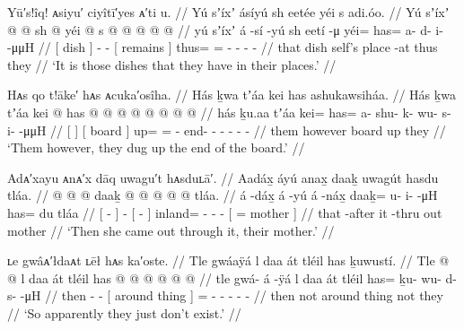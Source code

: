 \ex\label{ex:92-42-have-dishes-in-place}%
%
\begingl
	\glpreamble	Yū′s!îq! ᴀsiyu′ ciyîtī′yes ᴀ′ti u. //
	\glpreamble	Yú sʼíxʼ ásíyú sh eetée yéi s adi.óo. //
	\gla	{} Yú sʼíxʼ {}  @ {} @ {}
		{} sh  @ {} {}
		yéi @ s @  @ {} @ {} @ {} @ {} //
	\glb	{} yú sʼíxʼ {} á -sí -yú
		{} sh eetí -μ {}
		yéi= has= a- d- i-  -μμH //
	\glc	{}[  dish {}]  - -
		{}[  remains \· {}]
		thus= = - - -  - //
	\gld	{} that dish {}  {} {}
		{} self’s place -at {}
		thus they  {} {} {} {} //
	\glft	‘It is those dishes that they have in their places.’
		//
\endgl
\xe

\ex\label{ex:92-43-dug-up-board}%
%
\begingl
	\glpreamble	Hᴀs qo t!āke′ hᴀs ᴀcuka′osîha. //
	\glpreamble	Hás ḵwa tʼáa kei has ashukawsiháa. //
	\gla	{} Hás {} ḵwa {} tʼáa {}
		kei @ has @  @ {} @ {} @ {} @ {} @ {} @ {} @ {} //
	\glb	{} hás {} ḵu.aa {} tʼáa {}
		kei= has= a- shu- k- wu- s- i-  -μμH //
	\glc	{}[  {}]  {}[ board {}]
		up= = - end- - - - -
			 - //
	\gld	{} them {} however {} board {}
		up they  {} {} {} {} {} {} {} //
	\glft	‘Them however, they dug up the end of the board.’
		//
\endgl
\xe

\ex\label{ex:92-44-then-mother-came-out}%
%
\begingl
	\glpreamble	Adᴀ′xayu ᴀnᴀ′x dāq uwagu′t hᴀsduʟā′. //
	\glpreamble	Aadáx̱ áyú anax̱ daaḵ uwagút hasdu tláa. //
	\gla	{}  @ {} {}  @ {}
		{}  @ {} {} daaḵ @  @ {} @ {} @ {}
		{}  @ {} tláa. {} //
	\glb	{} á -dáx̱ {} á -yú
		{} á -náx̱ {} daaḵ= u- i-  -μH
		{} has= du tláa {} //
	\glc	{}[  - {}]  -
		{}[  - {}] inland= - -
			 -
		{}[ =  mother {}] //
	\gld	{} that -after {}  {}
		{} it -thru {} out  {} {} {}
		{}  {} mother {} //
	\glft	‘Then she came out through it, their mother.’
		//
\endgl
\xe

\ex\label{ex:92-45-dont-exist}%
%
\begingl
	\glpreamble	ʟe gwâᴀ′łdaᴀt ʟēł hᴀs ka′oste. //
	\glpreamble	Tle gwáaÿá l daa át tléil has ḵuwustí. //
	\gla	Tle  @ {} @ {}
		{} l daa át {}
		tléil has @  @ {} @ {} @ {} @ {} @ {} //
	\glb	tle gwá- á -ÿá
		{} l daa át {}
		tléil has= ḵu- wu- d- s-  -μH //
	\glc	then -  -
		{}[  around thing {}]
		 = - - - -
			 - //
	\gld	then  {} {}
		{} not around thing {}
		not they  {} {} {} {} {} //
	\glft	‘So apparently they just don’t exist.’
		//
\endgl
\xe

